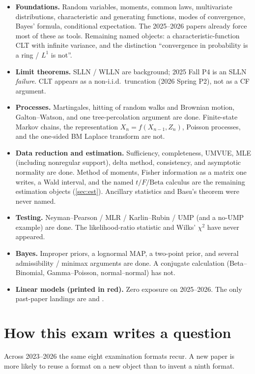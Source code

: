 \begin{itemize}
    \item \textbf{Foundations.} Random variables, moments, common laws, multivariate distributions, characteristic and generating functions, modes of convergence, Bayes' formula, conditional expectation. The 2025--2026 papers already force most of these as tools. Remaining named objects: a characteristic-function CLT with infinite variance, and the distinction ``convergence in probability is a ring / \(L^{1}\) is not''.
    \item \textbf{Limit theorems.} SLLN / WLLN are background; 2025 Fall P4 is an SLLN \emph{failure}. CLT appears as a non-i.i.d.\ truncation (2026 Spring P2), not as a CF argument.
    \item \textbf{Processes.} Martingales, hitting of random walks and Brownian motion, Galton--Watson, and one tree-percolation argument are done. Finite-state Markov chains, the representation \(X_{n}=f(X_{n-1},Z_{n})\), Poisson processes, and the one-sided BM Laplace transform are not.
    \item \textbf{Data reduction and estimation.} Sufficiency, completeness, UMVUE, MLE (including nonregular support), delta method, consistency, and asymptotic normality are done. Method of moments, Fisher information as a matrix one writes, a Wald interval, and the named \(t/F/\mathrm{Beta}\) calculus are the remaining estimation objects (\cref{sec:est}). Ancillary statistics and Basu's theorem were never named.
    \item \textbf{Testing.} Neyman--Pearson / MLR / Karlin--Rubin / UMP (and a no-UMP example) are done. The likelihood-ratio statistic and Wilks' \(\chi^{2}\) have never appeared.
    \item \textbf{Bayes.} Improper priors, a lognormal MAP, a two-point prior, and several admissibility / minimax arguments are done. A conjugate calculation (Beta--Binomial, Gamma--Poisson, normal--normal) has not.
    \item \textbf{Linear models (printed in red).} Zero exposure on 2025--2026. The only past-paper landings are  and .
\end{itemize}

\section{How this exam writes a question}
\label{sec:format}

Across 2023--2026 the same eight examination formats recur. A new paper is more likely to reuse a format on a new object than to invent a ninth format.

